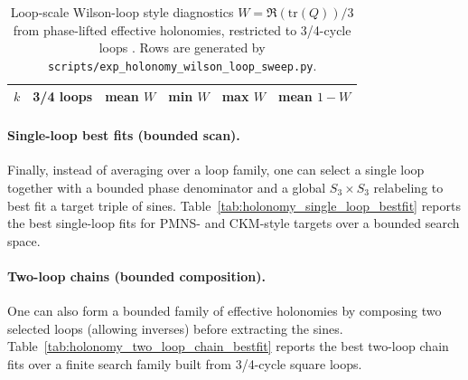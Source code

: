 \begin{table}[t]
\centering
\scriptsize
\setlength{\tabcolsep}{10pt}
\renewcommand{\arraystretch}{1.15}
\begin{tabular}{rrrrrr}
\toprule
$k$ & 3/4 loops & mean $W$ & min $W$ & max $W$ & mean $1-W$ \\
\midrule
%
\end{tabular}
\caption{Loop-scale Wilson-loop style diagnostics $W=\Re(\mathrm{tr}(Q))/3$ from phase-lifted effective holonomies, restricted to 3/4-cycle loops \cite{Wilson1974,Rothe2012}. Rows are generated by \texttt{scripts/exp\_holonomy\_wilson\_loop\_sweep.py}.}
\label{tab:holonomy_wilson_loop}
\end{table}

\paragraph{Single-loop best fits (bounded scan).}
Finally, instead of averaging over a loop family, one can select a single loop together with a bounded phase denominator and a global $S_3\times S_3$ relabeling to best fit a target triple of sines.
Table~\ref{tab:holonomy_single_loop_bestfit} reports the best single-loop fits for PMNS- and CKM-style targets over a bounded search space.

\begin{table}[t]
\centering
\scriptsize
\setlength{\tabcolsep}{4pt}
\renewcommand{\arraystretch}{1.15}
%
\caption{Best single-loop fits to PMNS/CKM target sines under a bounded scan over $k\times k$ loops ($k\le 7$), phase denominators $\mathrm{denom}=2^p$ ($6\le p\le 18$), and global relabelings in $S_3\times S_3$. Rows are generated by \texttt{scripts/exp\_holonomy\_single\_loop\_bestfit.py}.}
\label{tab:holonomy_single_loop_bestfit}
\end{table}

\paragraph{Two-loop chains (bounded composition).}
One can also form a bounded family of effective holonomies by composing two selected loops (allowing inverses) before extracting the sines.
Table~\ref{tab:holonomy_two_loop_chain_bestfit} reports the best two-loop chain fits over a finite search family built from 3/4-cycle square loops.

